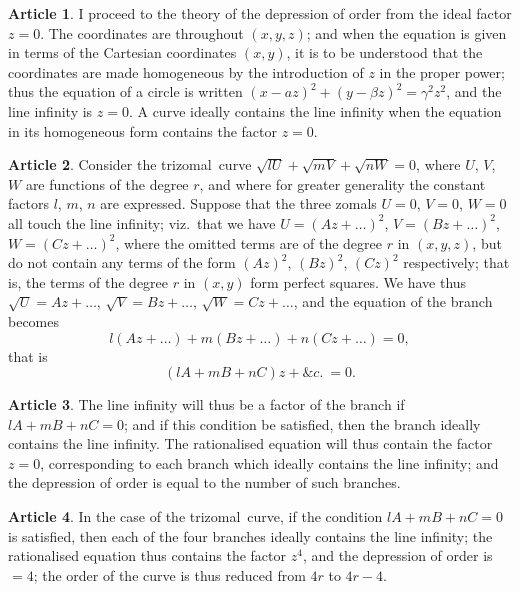 \documentclass[11pt,a4paper]{article}
\theoremstyle{definition}
\newtheorem{art}{Article}
\newcommand{\trizomal}{trizomal}
\begin{document}
\begin{art}
I proceed to the theory of the depression of order from the ideal factor $z = 0$. The coordinates are throughout $(x, y, z)$; and when the equation is given in terms of the Cartesian coordinates $(x, y)$, it is to be understood that the coordinates are made homogeneous by the introduction of $z$ in the proper power; thus the equation of a circle is written $(x - az)^{2} + (y - \beta z)^{2} = \gamma^{2}z^{2}$, and the line infinity is $z = 0$. A curve ideally contains the line infinity when the equation in its homogeneous form contains the factor $z = 0$.
\end{art}

\begin{art}
Consider the \trizomal\ curve $\sqrt{lU} + \sqrt{mV} + \sqrt{nW} = 0$, where $U$, $V$, $W$ are functions of the degree $r$, and where for greater generality the constant factors $l$, $m$, $n$ are expressed. Suppose that the three zomals $U = 0$, $V = 0$, $W = 0$ all touch the line infinity; viz.\ that we have $U = (Az + \ldots)^{2}$, $V = (Bz + \ldots)^{2}$, $W = (Cz + \ldots)^{2}$, where the omitted terms are of the degree $r$ in $(x, y, z)$, but do not contain any terms of the form $(Az)^{2}$, $(Bz)^{2}$, $(Cz)^{2}$ respectively; that is, the terms of the degree $r$ in $(x, y)$ form perfect squares. We have thus $\sqrt{U} = Az + \ldots$, $\sqrt{V} = Bz + \ldots$, $\sqrt{W} = Cz + \ldots$, and the equation of the branch becomes
\[
l(Az + \ldots) + m(Bz + \ldots) + n(Cz + \ldots) = 0,
\]
that is
\[
(lA + mB + nC)z + \&c.\ = 0.
\]
\end{art}

\begin{art}
The line infinity will thus be a factor of the branch if $lA + mB + nC = 0$; and if this condition be satisfied, then the branch ideally contains the line infinity. The rationalised equation will thus contain the factor $z = 0$, corresponding to each branch which ideally contains the line infinity; and the depression of order is equal to the number of such branches.
\end{art}

\begin{art}
In the case of the \trizomal\ curve, if the condition $lA + mB + nC = 0$ is satisfied, then each of the four branches ideally contains the line infinity; the rationalised equation thus contains the factor $z^{4}$, and the depression of order is $= 4$; the order of the curve is thus reduced from $4r$ to $4r - 4$.
\end{art}
\end{document}
